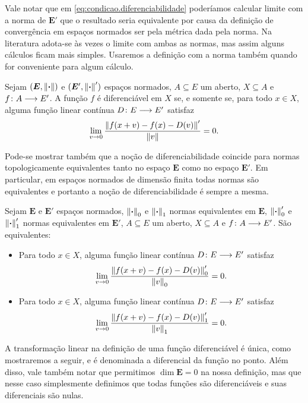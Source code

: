 Vale notar que em \ref{eq:condicao.diferenciabilidade} poderíamos calcular limite com a norma de $\bm E'$ que o resultado seria equivalente por causa da definição de convergência em espaços normados ser pela métrica dada pela norma. Na literatura adota-se às vezes o limite com ambas as normas, mas assim alguns cálculos ficam mais simples. Usaremos a definição com a norma também quando for conveniente para algum cálculo.

\begin{exercise}
Sejam $(\bm E,\left\Vert{\bm{\cdot}}\right\Vert)$ e $(\bm E',\left\Vert{\bm{\cdot}}\right\Vert')$ espaços normados, $A \subseteq E$ um aberto, $X \subseteq A$ e ${f}\colon {A} \longrightarrow {E'}$. A função $f$ é diferenciável em $X$ se, e somente se, para todo $x \in X$, alguma função linear contínua ${D}\colon {E} \longrightarrow {E'}$ satisfaz
	\begin{equation*}
	\lim_{v \to 0} \frac{\left\Vert{f(x+v) - f(x) - D(v)}\right\Vert'}{\left\Vert{v}\right\Vert} = 0.
	\end{equation*}
\end{exercise}

Pode-se mostrar também que a noção de diferenciabilidade coincide para normas topologicamente equivalentes tanto no espaço $\bm E$ como no espaço $\bm E'$. Em particular, em espaços normados de dimensão finita todas normas são equivalentes e portanto a noção de diferenciabilidade é sempre a mesma.

\begin{exercise}
Sejam $\bm E$ e $\bm E'$ espaços normados, $\left\Vert{\bm{\cdot}}\right\Vert_0$ e $\left\Vert{\bm{\cdot}}\right\Vert_1$ normas equivalentes em $\bm E$, $\left\Vert{\bm{\cdot}}\right\Vert'_0$ e $\left\Vert{\bm{\cdot}}\right\Vert'_1$ normas equivalentes em $\bm E'$, $A \subseteq E$ um aberto, $X \subseteq A$ e ${f}\colon {A} \longrightarrow {E'}$. São equivalentes:
	\begin{itemize}
	\item Para todo $x \in X$, alguma função linear contínua ${D}\colon {E} \longrightarrow {E'}$ satisfaz
		\begin{equation*}
		\lim_{v \to 0} \frac{\left\Vert{f(x+v) - f(x) - D(v)}\right\Vert'_0}{\left\Vert{v}\right\Vert_0} = 0.
		\end{equation*}
	\item Para todo $x \in X$, alguma função linear contínua ${D}\colon {E} \longrightarrow {E'}$ satisfaz
		\begin{equation*}
		\lim_{v \to 0} \frac{\left\Vert{f(x+v) - f(x) - D(v)}\right\Vert'_1}{\left\Vert{v}\right\Vert_1} = 0.
		\end{equation*}
	\end{itemize}
\end{exercise}

A transformação linear na definição de uma função diferenciável é única, como mostraremos a seguir, e é denominada a diferencial da função no ponto. Além disso, vale também notar que permitimos $\dim \bm E = 0$ na nossa definição, mas que nesse caso simplesmente definimos que todas funções são diferenciáveis e suas diferenciais são nulas.


